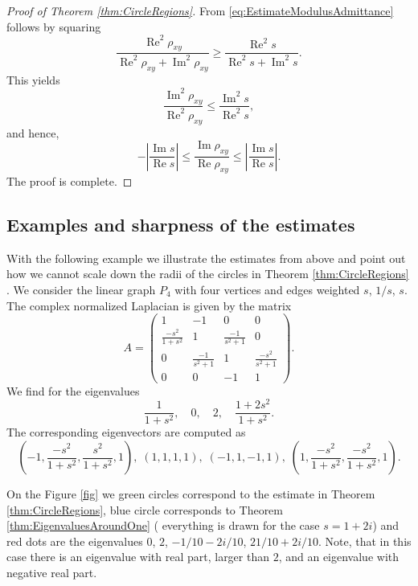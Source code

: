 \documentclass[a4paper,11pt]{amsart}
\theoremstyle{definition}
\renewcommand{\Re}{\operatorname{Re}}%
\renewcommand{\Im}{\operatorname{Im}}%
\begin{document}
\begin{proof}[Proof of Theorem \ref{thm:CircleRegions}]
From \eqref{eq:EstimateModulusAdmittance} follows by squaring
\begin{equation*}
\dfrac{\Re^2 \rho_{xy}}{\Re^2 \rho_{xy}+\Im^2 \rho_{xy}}\ge \dfrac{\Re^2 s}{\Re^2 s+\Im^2 s}.
\end{equation*}
This yields
\begin{equation*}
\dfrac{\Im^2 \rho_{xy}}{\Re^2 \rho_{xy}}\le \dfrac{\Im^2 s}{\Re^2 s},
\end{equation*}
and hence,
\begin{equation*}
-\left| \dfrac{\Im s}{\Re s}\right|\le \dfrac{\Im \rho_{xy}}{\Re\rho_{xy}}\le\left| \dfrac{\Im s}{\Re s}\right|.
\end{equation*}
The proof is complete.
\end{proof}

\subsection{Examples and sharpness of the estimates}

With the following example we illustrate the estimates from above and point out how we cannot scale down the radii of the circles in Theorem \ref{thm:CircleRegions}
.
We consider the linear graph $P_4$ with four vertices and edges weighted $s$, $1/s$, $s$.
The complex normalized Laplacian is given by the matrix
\begin{equation}
\label{eq:ComplexLaplacian}
A = 
\begin{pmatrix}
1 & - 1 & 0 & 0 \\
\frac{-s^2}{1+s^2} & 1 & \frac{-1}{s^2 + 1} & 0 \\
0 & \frac{-1}{s^2+1} & 1 & \frac{-s^2}{s^2+1} \\
0 & 0 & -1 & 1
\end{pmatrix}
.
\end{equation}
We find for the eigenvalues
\begin{equation}
\label{eq:EigenvaluesA4}
\frac{1}{1+s^2}, \quad 0, \quad 2, \quad \frac{1+2s^2}{1+s^2}.
\end{equation}
The corresponding eigenvectors are computed as
\begin{equation*}
(-1,\frac{-s^2}{1+s^2}, \frac{s^2}{1+s^2}, 1), \; (1,1,1,1), \; (-1,1,-1,1), \; (1,\frac{-s^2}{1+s^2},\frac{-s^2}{1+s^2}, 1).
\end{equation*}

On the Figure \ref{fig} we green circles correspond to the estimate in Theorem \ref{thm:CircleRegions}, blue circle corresponds to Theorem \ref{thm:EigenvaluesAroundOne}  (
everything is drawn for the case $s=1+2i$) and red dots are the eigenvalues $0$, $2$, $-1/10-2i/10$, $21/10+2i/10$. Note, that in this case there is an eigenvalue with real part, larger than $2$, and an eigenvalue with negative real part.
\end{document}
